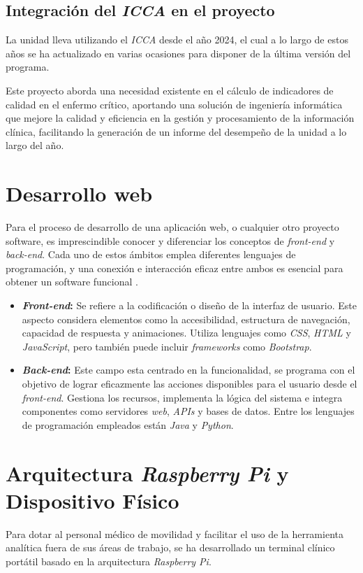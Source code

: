 \subsection{Integración del \textit{ICCA} en el proyecto}
La unidad lleva utilizando el \textit{ICCA} desde el año 2024, el 
cual a lo largo de estos años se ha actualizado en varias ocasiones para disponer de la última versión del programa. 

Este proyecto aborda una necesidad existente en el cálculo de 
indicadores de calidad en el enfermo crítico, aportando una solución de ingeniería 
informática que mejore la calidad y eficiencia en la gestión y procesamiento de la 
información clínica, facilitando la generación de un informe del desempeño de la unidad a 
lo largo del año.

\section{Desarrollo web}
Para el proceso de desarrollo de una aplicación web, o cualquier otro proyecto software, es imprescindible conocer y diferenciar los conceptos de \textit{front-end} y \textit{back-end}. Cada uno de estos ámbitos emplea diferentes lenguajes de programación, y una conexión e interacción eficaz entre ambos es esencial para obtener un software funcional \cite{UniEuro}.

\begin{itemize}
    \item \textbf{\textit{Front-end}:} Se refiere a la codificación o diseño de la interfaz de usuario. Este aspecto considera elementos como la accesibilidad, estructura de navegación, capacidad de respuesta y animaciones. Utiliza lenguajes como \textit{CSS}, \textit{HTML} y \textit{JavaScript}, pero también puede incluir \textit{frameworks} como \textit{Bootstrap}. \cite{Hubspot} \cite{UniEuro}

    \item \textbf{\textit{Back-end}:} Este campo esta centrado en la funcionalidad, se programa con el objetivo de lograr eficazmente las acciones disponibles para el usuario desde el \textit{front-end}. Gestiona los recursos, implementa la lógica del sistema e integra componentes como servidores \textit{web}, \textit{APIs} y bases de datos. Entre los lenguajes de programación empleados están \textit{Java} y \textit{Python}. \cite{Hubspot} \cite{UniEuro}
\end{itemize}

\section{Arquitectura \textit{Raspberry Pi} y Dispositivo Físico}
Para dotar al personal médico de movilidad y facilitar el uso de la herramienta analítica fuera de sus áreas de trabajo, se ha desarrollado un terminal clínico portátil basado en la arquitectura \textit{Raspberry Pi}.

